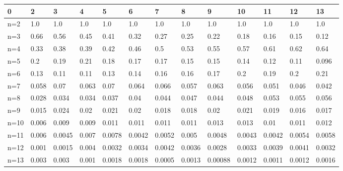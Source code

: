 \begin{tabular}{l|llllllllllll}
\toprule 
0 & 2 & 3 & 4 & 5 & 6 & 7 & 8 & 9 & 10 & 11 & 12 & 13 \\
\hline 
n=2 & 1.0 & 1.0 & 1.0 & 1.0 & 1.0 & 1.0 & 1.0 & 1.0 & 1.0 & 1.0 & 1.0 & 1.0 \\
n=3 & 0.66 & 0.56 & 0.45 & 0.41 & 0.32 & 0.27 & 0.25 & 0.22 & 0.18 & 0.16 & 0.15 & 0.12 \\
n=4 & 0.33 & 0.38 & 0.39 & 0.42 & 0.46 & 0.5 & 0.53 & 0.55 & 0.57 & 0.61 & 0.62 & 0.64 \\
n=5 & 0.2 & 0.19 & 0.21 & 0.18 & 0.17 & 0.17 & 0.15 & 0.15 & 0.14 & 0.12 & 0.11 & 0.096 \\
n=6 & 0.13 & 0.11 & 0.11 & 0.13 & 0.14 & 0.16 & 0.16 & 0.17 & 0.2 & 0.19 & 0.2 & 0.21 \\
n=7 & 0.058 & 0.07 & 0.063 & 0.07 & 0.064 & 0.066 & 0.057 & 0.063 & 0.056 & 0.051 & 0.046 & 0.042 \\
n=8 & 0.028 & 0.034 & 0.034 & 0.037 & 0.04 & 0.044 & 0.047 & 0.044 & 0.048 & 0.053 & 0.055 & 0.056 \\
n=9 & 0.015 & 0.024 & 0.02 & 0.021 & 0.02 & 0.018 & 0.018 & 0.02 & 0.021 & 0.019 & 0.016 & 0.017 \\
n=10 & 0.006 & 0.009 & 0.009 & 0.011 & 0.011 & 0.011 & 0.011 & 0.013 & 0.013 & 0.01 & 0.011 & 0.012 \\
n=11 & 0.006 & 0.0045 & 0.007 & 0.0078 & 0.0042 & 0.0052 & 0.005 & 0.0048 & 0.0043 & 0.0042 & 0.0054 & 0.0058 \\
n=12 & 0.001 & 0.0015 & 0.004 & 0.0032 & 0.0034 & 0.0042 & 0.0036 & 0.0028 & 0.0033 & 0.0039 & 0.0041 & 0.0032 \\
n=13 & 0.003 & 0.003 & 0.001 & 0.0018 & 0.0018 & 0.0005 & 0.0013 & 0.00088 & 0.0012 & 0.0011 & 0.0012 & 0.0016 \\
\bottomrule 
\end{tabular}
